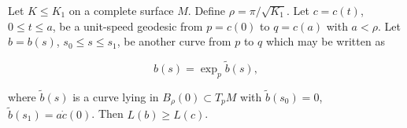 Let $K \leq K_1$ on a complete surface $M$. Define $\rho = \pi/\sqrt{K_1}$. Let $c = c(t)$, $0 \leq t \leq a$, be a unit-speed geodesic from $p = c(0)$ to $q = c(a)$ with $a < \rho$. Let $b = b(s)$, $s_0 \leq s \leq s_1$, be another curve from $p$ to $q$ which may be written as

$$b(s) = \exp_p \tilde{b}(s),$$

where $\tilde{b}(s)$ is a curve lying in $B_\rho(0) \subset T_p M$ with $\tilde{b}(s_0) = 0$, $\tilde{b}(s_1) = a\dot{c}(0)$. Then $L(b) \geq L(c)$.
